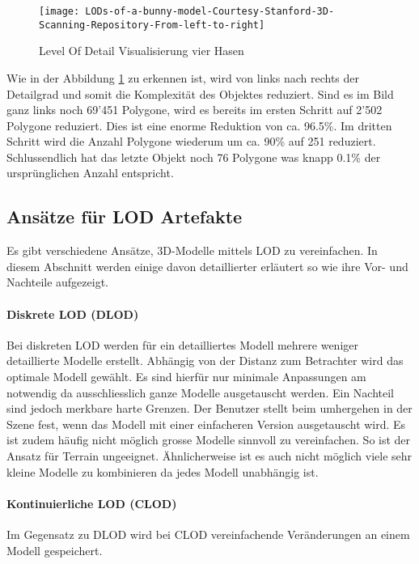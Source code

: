 \begin{figure}[H]
\centering
\texttt{[image: LODs-of-a-bunny-model-Courtesy-Stanford-3D-Scanning-Repository-From-left-to-right]}
\caption{Level Of Detail Visualisierung vier Hasen}
\label{fig:LevelOfDetailVisualisierungvierHasen}
\end{figure}

Wie in der Abbildung \ref{fig:LevelOfDetailVisualisierungvierHasen} zu erkennen ist, wird von links nach rechts der Detailgrad und somit die Komplexität des Objektes reduziert. Sind es im Bild ganz links noch 69'451 Polygone, wird es bereits im ersten Schritt auf 2'502 Polygone reduziert. Dies ist eine enorme Reduktion von ca. 96.5\%. Im dritten Schritt wird die Anzahl Polygone wiederum um ca. 90\% auf 251 reduziert. Schlussendlich hat das letzte Objekt noch 76 Polygone was knapp 0.1\% der ursprünglichen Anzahl entspricht.

\subsection{Ansätze für LOD Artefakte}
\label{chap:differentLodApproaches}
Es gibt verschiedene Ansätze, 3D-Modelle mittels LOD zu vereinfachen. In diesem Abschnitt werden einige davon detaillierter erläutert so wie ihre Vor- und Nachteile aufgezeigt.

\paragraph{Diskrete LOD (DLOD)}
Bei diskreten LOD werden für ein detailliertes Modell mehrere weniger detaillierte Modelle erstellt.
Abhängig von der Distanz zum Betrachter wird das optimale Modell gewählt. Es sind hierfür nur minimale Anpassungen am  notwendig da ausschliesslich ganze Modelle ausgetauscht werden.
Ein Nachteil sind jedoch merkbare harte Grenzen. Der Benutzer stellt beim umhergehen in der Szene fest, wenn das Modell mit einer einfacheren Version ausgetauscht wird.
Es ist zudem häufig nicht möglich grosse Modelle sinnvoll zu vereinfachen. So ist der Ansatz für Terrain ungeeignet. Ähnlicherweise ist es auch nicht möglich viele sehr kleine Modelle zu kombinieren da jedes Modell unabhängig ist.

\paragraph{Kontinuierliche LOD (CLOD)}
Im Gegensatz zu DLOD wird bei CLOD vereinfachende Veränderungen an einem Modell gespeichert.

